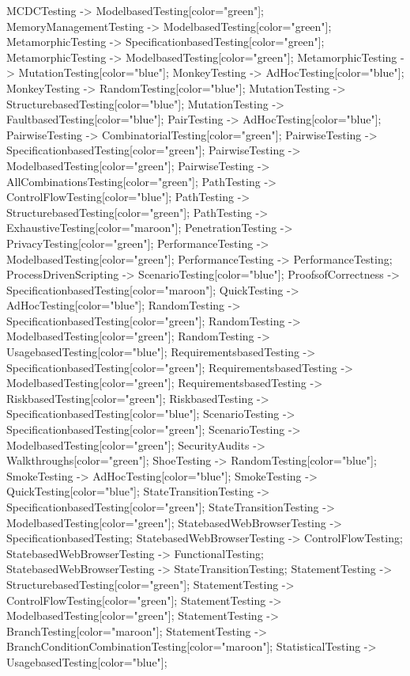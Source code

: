 \documentclass{article}
\begin{document}
{MCDCTesting -> ModelbasedTesting[color="green"];
MemoryManagementTesting -> ModelbasedTesting[color="green"];
MetamorphicTesting -> SpecificationbasedTesting[color="green"];
MetamorphicTesting -> ModelbasedTesting[color="green"];
MetamorphicTesting -> MutationTesting[color="blue"];
MonkeyTesting -> AdHocTesting[color="blue"];
MonkeyTesting -> RandomTesting[color="blue"];
MutationTesting -> StructurebasedTesting[color="blue"];
MutationTesting -> FaultbasedTesting[color="blue"];
PairTesting -> AdHocTesting[color="blue"];
PairwiseTesting -> CombinatorialTesting[color="green"];
PairwiseTesting -> SpecificationbasedTesting[color="green"];
PairwiseTesting -> ModelbasedTesting[color="green"];
PairwiseTesting -> AllCombinationsTesting[color="green"];
PathTesting -> ControlFlowTesting[color="blue"];
PathTesting -> StructurebasedTesting[color="green"];
PathTesting -> ExhaustiveTesting[color="maroon"];
PenetrationTesting -> PrivacyTesting[color="green"];
PerformanceTesting -> ModelbasedTesting[color="green"];
PerformanceTesting -> PerformanceTesting;
ProcessDrivenScripting -> ScenarioTesting[color="blue"];
ProofsofCorrectness -> SpecificationbasedTesting[color="maroon"];
QuickTesting -> AdHocTesting[color="blue"];
RandomTesting -> SpecificationbasedTesting[color="green"];
RandomTesting -> ModelbasedTesting[color="green"];
RandomTesting -> UsagebasedTesting[color="blue"];
RequirementsbasedTesting -> SpecificationbasedTesting[color="green"];
RequirementsbasedTesting -> ModelbasedTesting[color="green"];
RequirementsbasedTesting -> RiskbasedTesting[color="green"];
RiskbasedTesting -> SpecificationbasedTesting[color="blue"];
ScenarioTesting -> SpecificationbasedTesting[color="green"];
ScenarioTesting -> ModelbasedTesting[color="green"];
SecurityAudits -> Walkthroughs[color="green"];
ShoeTesting -> RandomTesting[color="blue"];
SmokeTesting -> AdHocTesting[color="blue"];
SmokeTesting -> QuickTesting[color="blue"];
StateTransitionTesting -> SpecificationbasedTesting[color="green"];
StateTransitionTesting -> ModelbasedTesting[color="green"];
StatebasedWebBrowserTesting -> SpecificationbasedTesting;
StatebasedWebBrowserTesting -> ControlFlowTesting;
StatebasedWebBrowserTesting -> FunctionalTesting;
StatebasedWebBrowserTesting -> StateTransitionTesting;
StatementTesting -> StructurebasedTesting[color="green"];
StatementTesting -> ControlFlowTesting[color="green"];
StatementTesting -> ModelbasedTesting[color="green"];
StatementTesting -> BranchTesting[color="maroon"];
StatementTesting -> BranchConditionCombinationTesting[color="maroon"];
StatisticalTesting -> UsagebasedTesting[color="blue"];
}
\end{document}
